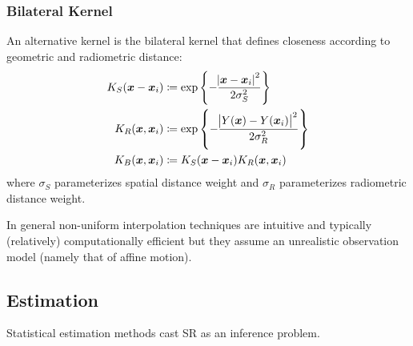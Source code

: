 \subsubsection{Bilateral Kernel}
An alternative kernel is the bilateral kernel \cite{Tomasi:1998:BFG:938978.939190} that defines closeness according to geometric and radiometric distance:
\begin{equation}
    \begin{split}
        K_S(\bm{x} - \bm{x}_i) &\coloneqq \exp \left\{ -\frac{\abs{ \bm{x} - \bm{x}_i }^2}{2 \sigma_S^2}  \right\} \\
        K_R(\bm{x}, \bm{x}_i) &\coloneqq \exp \left\{ -  \frac{\abs{ Y(\bm{x}) - Y(\bm{x}_i) }^2}{2 \sigma_R^2} \right\} \\
        K_B(\bm{x}, \bm{x}_i) &\coloneqq K_S(\bm{x} - \bm{x}_i)K_R(\bm{x}, \bm{x}_i)
    \end{split}
    \label{eqn:bilateralkernel}
\end{equation}
where \(\sigma_S\) parameterizes spatial distance weight and \(\sigma_R\) parameterizes radiometric distance weight.

In general non-uniform interpolation techniques are intuitive and typically (relatively) computationally efficient but they assume an unrealistic observation model (namely that of affine motion).

\subsection{Estimation}\label{subsec:estimation}

Statistical estimation methods cast SR as an inference problem.
%
